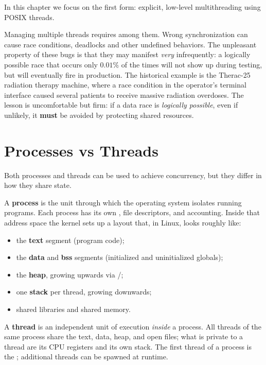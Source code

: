 In this chapter we focus on the first form: explicit, low-level multithreading using POSIX threads.

\begin{warningblock}
Managing multiple threads requires  among them. Wrong synchronization can cause race conditions, deadlocks and other undefined behaviors. The unpleasant property of these bugs is that they may manifest \emph{very} infrequently: a logically possible race that occurs only $0.01\%$ of the times will not show up during testing, but will eventually fire in production. The historical example is the Therac-25 radiation therapy machine, where a race condition in the operator's terminal interface caused several patients to receive massive radiation overdoses. The lesson is uncomfortable but firm: if a data race is \emph{logically possible}, even if unlikely, it \textbf{must} be avoided by protecting shared resources.
\end{warningblock}

\section{Processes vs Threads}

Both processes and threads can be used to achieve concurrency, but they differ in how they share state.

A \textbf{process} is the unit through which the operating system isolates running programs. Each process has its own , file descriptors, and accounting. Inside that address space the kernel sets up a layout that, in Linux, looks roughly like:

\vspace{-0.5em}
\begin{itemize}[noitemsep]
    \item the \textbf{text} segment (program code);
    \item the \textbf{data} and \textbf{bss} segments (initialized and uninitialized globals);
    \item the \textbf{heap}, growing upwards via /;
    \item one \textbf{stack} per thread, growing downwards;
    \item shared libraries and shared memory.
\end{itemize}

A \textbf{thread} is an independent unit of execution \emph{inside} a process. All threads of the same process share the text, data, heap, and open files; what is private to a thread are its CPU registers and its own stack. The first thread of a process is the ; additional threads can be spawned at runtime.

